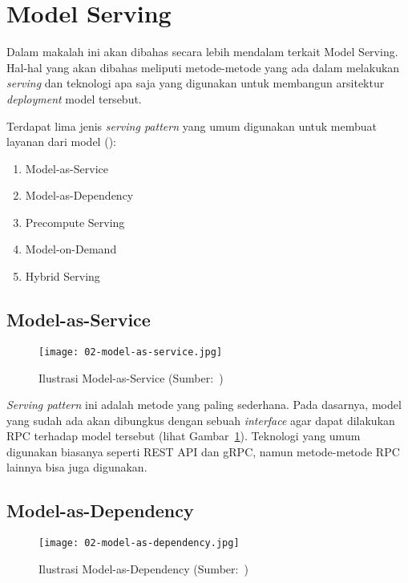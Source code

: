 \section{Model Serving}\label{chap:model-serving}

Dalam makalah ini akan dibahas secara lebih mendalam terkait Model Serving.
Hal-hal yang akan dibahas meliputi metode-metode yang ada dalam melakukan \textit{serving} dan teknologi apa saja yang digunakan untuk membangun arsitektur \textit{deployment} model tersebut.

Terdapat lima jenis \textit{serving pattern} yang umum digunakan untuk membuat layanan dari model (\cite{mlopsorg}):
\begin{enumerate}
  \item Model-as-Service
  \item Model-as-Dependency
  \item Precompute Serving
  \item Model-on-Demand
  \item Hybrid Serving
\end{enumerate}

\subsection{Model-as-Service}

\begin{figure}[ht]
  \centering
  \texttt{[image: 02-model-as-service.jpg]}
  \caption{Ilustrasi Model-as-Service (Sumber:~\cite{book-handsonml})}\label{fig:model-as-service}
\end{figure}

\textit{Serving pattern} ini adalah metode yang paling sederhana.
Pada dasarnya, model yang sudah ada akan dibungkus dengan sebuah \textit{interface} agar dapat dilakukan RPC terhadap model tersebut (lihat Gambar~\ref{fig:model-as-service}).
Teknologi yang umum digunakan biasanya seperti REST API dan gRPC, namun metode-metode RPC lainnya bisa juga digunakan.

\subsection{Model-as-Dependency}

\begin{figure}[ht]
  \centering
  \texttt{[image: 02-model-as-dependency.jpg]}
  \caption{Ilustrasi Model-as-Dependency (Sumber:~\cite{book-handsonml})}\label{fig:model-as-dependency}
\end{figure}

